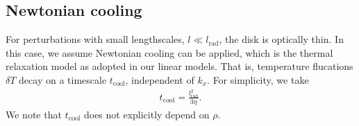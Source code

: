 \subsection{Newtonian cooling}\label{newton_cool}
For perturbations with small lengthscales, $l\ll l_\mathrm{rad}$, 
the disk is optically thin. In this case, we assume 
Newtonian cooling can be applied, which is the thermal
relaxation model as adopted in our linear models. That is, temperature
flucations $\delta T$ decay on a timescale $t_\mathrm{cool}$,
independent of $k_x$. For simplicity, we take  
\begin{align}
  t_\mathrm{cool} = \frac{l_\mathrm{rad}^2}{3\eta}. 
\end{align}
We note that $t_\mathrm{cool}$ does not explicitly depend on $\rho$. 

